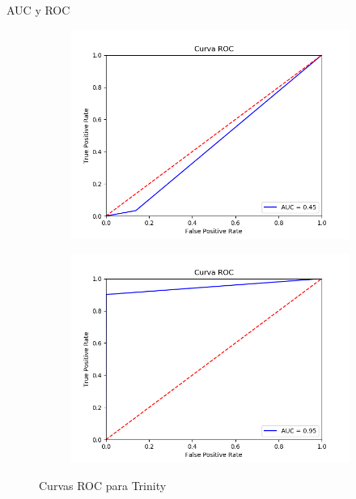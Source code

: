 \documentclass[10pt]{beamer}
\begin{document}
\begin{frame}[fragile]{AUC y ROC}
\vspace{10px}

\begin{figure}[H]
	\centering
	\begin{subfigure}{.49\textwidth}
		\centering
		\includegraphics[scale=0.35]{Imagenes/roc/TRINITY_vertebral}
	\end{subfigure}
	\begin{subfigure}{.49\textwidth}
		\centering
		\includegraphics[scale=0.35]{Imagenes/roc/TRINITY_satimage-2}
	\end{subfigure}
	\caption*{Curvas ROC para Trinity}
	\label{ROC_TRINITY}
\end{figure}

\end{frame}
\end{document}
